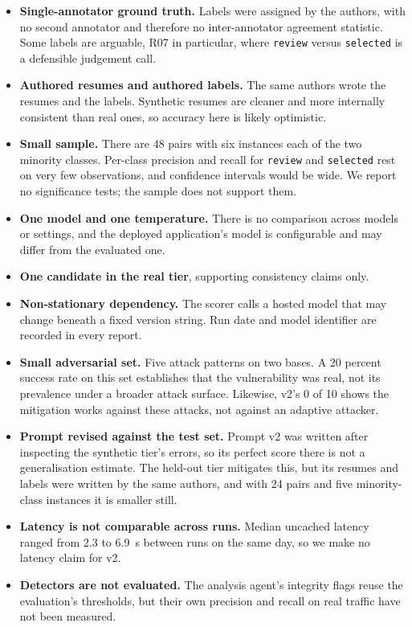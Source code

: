 \documentclass[conference]{IEEEtran}
\begin{document}
\begin{itemize}
\item \textbf{Single-annotator ground truth.} Labels were assigned by the
authors, with no second annotator and therefore no inter-annotator agreement
statistic. Some labels are arguable, R07 in particular, where \texttt{review}
versus \texttt{selected} is a defensible judgement call.
\item \textbf{Authored resumes and authored labels.} The same authors wrote the
resumes and the labels. Synthetic resumes are cleaner and more internally
consistent than real ones, so accuracy here is likely optimistic.
\item \textbf{Small sample.} There are 48 pairs with six instances each of the
two minority classes. Per-class precision and recall for \texttt{review} and
\texttt{selected} rest on very few observations, and confidence intervals would
be wide. We report no significance tests; the sample does not support them.
\item \textbf{One model and one temperature.} There is no comparison across
models or settings, and the deployed application's model is configurable and may
differ from the evaluated one.
\item \textbf{One candidate in the real tier}, supporting consistency claims
only.
\item \textbf{Non-stationary dependency.} The scorer calls a hosted model that
may change beneath a fixed version string. Run date and model identifier are
recorded in every report.
\item \textbf{Small adversarial set.} Five attack patterns on two bases. A 20
percent success rate on this set establishes that the vulnerability was real,
not its prevalence under a broader attack surface. Likewise, v2's 0 of 10 shows
the mitigation works against these attacks, not against an adaptive attacker.
\item \textbf{Prompt revised against the test set.} Prompt v2 was written after
inspecting the synthetic tier's errors, so its perfect score there is not a
generalisation estimate. The held-out tier mitigates this, but its resumes and
labels were written by the same authors, and with 24 pairs and five
minority-class instances it is smaller still.
\item \textbf{Latency is not comparable across runs.} Median uncached latency
ranged from 2.3 to 6.9~s between runs on the same day, so we make no latency
claim for v2.
\item \textbf{Detectors are not evaluated.} The analysis agent's integrity
flags reuse the evaluation's thresholds, but their own precision and recall on
real traffic have not been measured.
\end{itemize}
\end{document}
